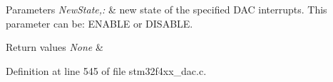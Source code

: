 \begin{DoxyParams}{Parameters}
{\em New\-State,\-:} & new state of the specified D\-A\-C interrupts. This parameter can be\-: E\-N\-A\-B\-L\-E or D\-I\-S\-A\-B\-L\-E. \\
\hline
\end{DoxyParams}

\begin{DoxyRetVals}{Return values}
{\em None} & \\
\hline
\end{DoxyRetVals}


Definition at line 545 of file stm32f4xx\-\_\-dac.\-c.

